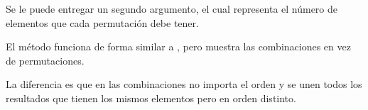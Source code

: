 
Se le puede entregar un segundo argumento, el cual representa el número de elementos que cada permutación debe tener.


El método  funciona de forma similar a , pero muestra las combinaciones en vez de permutaciones.


La diferencia es que en las combinaciones no importa el orden y se unen todos los resultados que tienen los mismos elementos pero en orden distinto.

\clearpage